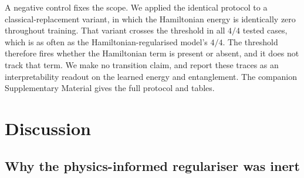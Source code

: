 \documentclass[pdflatex,sn-basic]{sn-jnl}
\begin{document}
A negative control fixes the scope. We applied the identical protocol to a
classical-replacement variant, in which the Hamiltonian energy is identically
zero throughout training. That variant crosses the threshold in all $4/4$ tested
cases, which is as often as the Hamiltonian-regularised model's $4/4$. The
threshold therefore fires whether the Hamiltonian term is present or absent, and
it does not track that term. We make no transition claim, and report these traces
as an interpretability readout on the learned energy and entanglement. The
companion Supplementary Material gives the full protocol and tables.

\section{Discussion}
\label{sec:discussion}

\subsection{Why the physics-informed regulariser was inert}
\label{sec:regularizer_inert}
\end{document}

